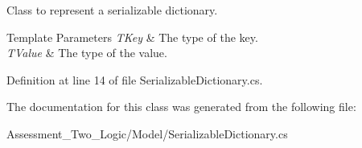 Class to represent a serializable dictionary. 
\begin{DoxyTemplParams}{Template Parameters}
{\em TKey} & The type of the key.\\
\hline
{\em TValue} & The type of the value.\\
\hline
\end{DoxyTemplParams}


Definition at line 14 of file SerializableDictionary.cs.



The documentation for this class was generated from the following file:\begin{DoxyCompactItemize}
\item 
Assessment\_\-Two\_\-Logic/Model/SerializableDictionary.cs\end{DoxyCompactItemize}

